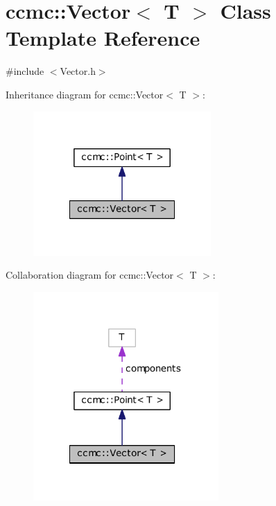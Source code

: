 \hypertarget{classccmc_1_1_vector}{\section{ccmc\-:\-:Vector$<$ T $>$ Class Template Reference}
\label{classccmc_1_1_vector}
}


{\ttfamily \#include $<$Vector.\-h$>$}



Inheritance diagram for ccmc\-:\-:Vector$<$ T $>$\-:
\nopagebreak
\begin{figure}[H]
\begin{center}
\leavevmode
\includegraphics[width=192pt]{classccmc_1_1_vector__inherit__graph}
\end{center}
\end{figure}


Collaboration diagram for ccmc\-:\-:Vector$<$ T $>$\-:
\nopagebreak
\begin{figure}[H]
\begin{center}
\leavevmode
\includegraphics[width=200pt]{classccmc_1_1_vector__coll__graph}
\end{center}
\end{figure}
